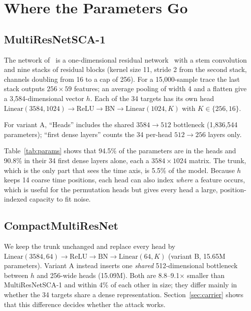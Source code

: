 \section{Where the Parameters Go}
\label{sec:params}

\subsection{MultiResNetSCA-1}
The network of~\cite{MS23} is a one-dimensional residual network~\cite{ResNet} with a stem
convolution and nine stacks of residual blocks (kernel size 11, stride 2 from the second stack,
channels doubling from 16 to a cap of 256). For a 15,000-sample trace the last stack outputs
$256\times 59$ features; an average pooling of width 4 and a flatten give a 3,584-dimensional
vector $h$. Each of the 34 targets has its own head
$\mathrm{Linear}(3584,1024)\to\mathrm{ReLU}\to\mathrm{BN}\to\mathrm{Linear}(1024,K)$ with
$K\in\{256,16\}$.

\begin{table}[t]
\centering
\caption{Parameter budget (15,000-sample input, depth 19).}
\label{tab:params}

\smallskip
{\footnotesize For variant A, ``Heads'' includes the shared $3584\to512$ bottleneck (1,836,544
parameters); ``first dense layers'' counts the 34 per-head $512\to256$ layers only.}
\end{table}

Table~\ref{tab:params} shows that 94.5\% of the parameters are in the heads and 90.8\% in their 34
first dense layers alone, each a $3584\times1024$ matrix. The trunk, which is the only part that
sees the time axis, is 5.5\% of the model. Because $h$ keeps 14 coarse time positions, each head can
also index \emph{where} a feature occurs, which is useful for the permutation heads but gives every
head a large, position-indexed capacity to fit noise.

\subsection{CompactMultiResNet}
We keep the trunk unchanged and replace every head by
$\mathrm{Linear}(3584,64)\to\mathrm{ReLU}\to\mathrm{BN}\to\mathrm{Linear}(64,K)$ (variant B,
15.65M parameters). Variant A instead inserts one \emph{shared} 512-dimensional bottleneck between
$h$ and 256-wide heads (15.09M). Both are 8.8--9.1$\times$ smaller than MultiResNetSCA-1 and within 4\% of each other in size; they
differ mainly in whether the 34 targets share a dense representation. Section~\ref{sec:carrier}
shows that this difference decides whether the attack works.
